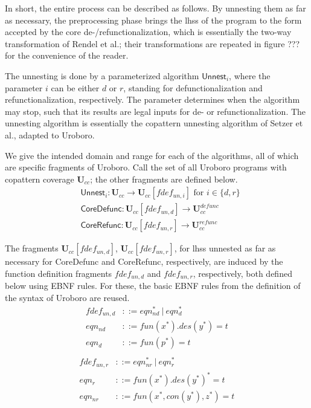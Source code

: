 In short, the entire process can be described as follows. By unnesting them as far as necessary, the preprocessing phase brings the lhss of the program to the form accepted by the core de-/refunctionalization, which is essentially the two-way transformation of Rendel et al.; their transformations are repeated in figure ??? for the convenience of the reader.

The unnesting is done by a parameterized algorithm $\textsf{Unnest}_i$, where the parameter $i$ can be either $d$ or $r$, standing for defunctionalization and refunctionalization, respectively. The parameter determines when the algorithm may stop, such that its results are legal inputs for de- or refunctionalization. The unnesting algorithm is essentially the copattern unnesting algorithm of Setzer et al.\cite{setzer14unnesting}, adapted to Uroboro.

We give the intended domain and range for each of the algorithms, all of which are specific fragments of Uroboro. Call the set of all Uroboro programs with copattern coverage $\mathbf{U}_{cc}$; the other fragments are defined below.
\begin{align*}
& \textsf{Unnest}_i: \mathbf{U}_{cc} \to \mathbf{U}_{cc}[fdef_{un,i}] \text{ for } i \in \{d,r\} \\
& \textsf{CoreDefunc}: \mathbf{U}_{cc}[fdef_{un,d}] \to \mathbf{U}^{defunc}_{cc} \\
& \textsf{CoreRefunc}: \mathbf{U}_{cc}[fdef_{un,r}] \to \mathbf{U}^{refunc}_{cc}
\end{align*}

\begin{definition}
The fragments $\mathbf{U}_{cc}[fdef_{un,d}]$, $\mathbf{U}_{cc}[fdef_{un,r}]$, for lhss unnested as far as necessary for \textsf{CoreDefunc} and \textsf{CoreRefunc}, respectively, are induced by the function definition fragments $fdef_{un,d}$ and $fdef_{un,r}$, respectively, both defined below using EBNF rules. For these, the basic EBNF rules from the definition of the syntax of Uroboro are reused.
\begin{align*}
fdef_{un,d} &::= eqn_{nd}^* ~ | ~ eqn_d^* \\
eqn_{nd} &::= fun(x^*).des(y^*) = t \\
eqn_d &::= fun(p^*) = t \\
\end{align*}
\begin{align*}
fdef_{un,r} &::= eqn_{nr}^* ~ | ~ eqn_r^* \\
eqn_r &::= fun(x^*).des(y^*)^* = t \\
eqn_{nr} &::= fun(x^*, con(y^*), z^*) = t \\
\end{align*}
\end{definition}

